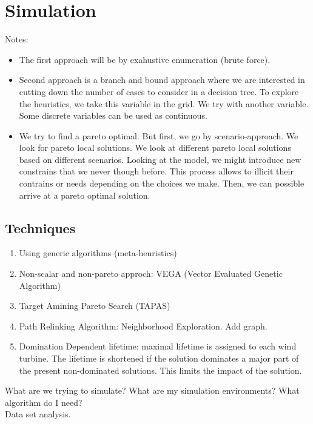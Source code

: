 \documentclass[12pt]{article}
\begin{document}
\section{Simulation}
Notes:
\begin{itemize}
\item The first approach will be by exahustive enumeration (brute force). 
\item Second approach is a branch and bound approach where we are interested in cutting down the number of cases to consider in a decision tree. To explore the heuristics, we take this variable in the grid. We try with another variable. Some discrete variables can be used as continuous. 
\item We try to find a pareto optimal. But first, we go by scenario-approach. We look for pareto local solutions. We look at different pareto local solutions based on different scenarios. Looking at the model, we might introduce new constrains that we never though before. This process allows to illicit their contrains or needs depending on the choices we make. Then, we can possible arrive at a pareto optimal solution. 
\end{itemize}

\subsection{Techniques}
\begin{enumerate}
\item Using generic algorithms (meta-heuristics)
\item Non-scalar and non-pareto approch: VEGA (Vector Evaluated Genetic Algorithm)
\item Target Amining Pareto Search (TAPAS)
\item Path Relinking Algorithm: Neighborhood Exploration. Add graph.  
\item Domination Dependent lifetime: maximal lifetime is assigned to each wind turbine. The lifetime is shortened if the solution dominates a major part of the present non-dominated solutions. This limits the impact of the solution. 
\end{enumerate}

What are we trying to simulate? What are my simulation environments? What algorithm do I need? \\

Data set analysis. 
\end{document}
